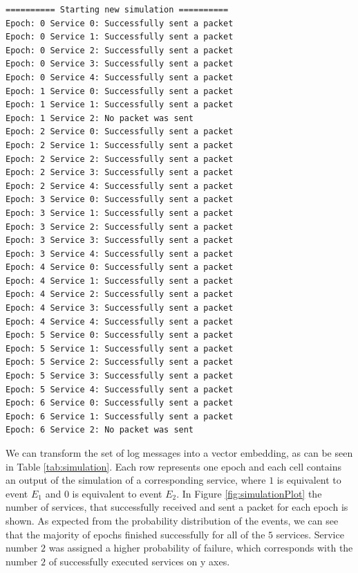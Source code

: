 \begin{verbatim}
========== Starting new simulation ==========
Epoch: 0 Service 0: Successfully sent a packet
Epoch: 0 Service 1: Successfully sent a packet
Epoch: 0 Service 2: Successfully sent a packet
Epoch: 0 Service 3: Successfully sent a packet
Epoch: 0 Service 4: Successfully sent a packet
Epoch: 1 Service 0: Successfully sent a packet
Epoch: 1 Service 1: Successfully sent a packet
Epoch: 1 Service 2: No packet was sent
Epoch: 2 Service 0: Successfully sent a packet
Epoch: 2 Service 1: Successfully sent a packet
Epoch: 2 Service 2: Successfully sent a packet
Epoch: 2 Service 3: Successfully sent a packet
Epoch: 2 Service 4: Successfully sent a packet
Epoch: 3 Service 0: Successfully sent a packet
Epoch: 3 Service 1: Successfully sent a packet
Epoch: 3 Service 2: Successfully sent a packet
Epoch: 3 Service 3: Successfully sent a packet
Epoch: 3 Service 4: Successfully sent a packet
Epoch: 4 Service 0: Successfully sent a packet
Epoch: 4 Service 1: Successfully sent a packet
Epoch: 4 Service 2: Successfully sent a packet
Epoch: 4 Service 3: Successfully sent a packet
Epoch: 4 Service 4: Successfully sent a packet
Epoch: 5 Service 0: Successfully sent a packet
Epoch: 5 Service 1: Successfully sent a packet
Epoch: 5 Service 2: Successfully sent a packet
Epoch: 5 Service 3: Successfully sent a packet
Epoch: 5 Service 4: Successfully sent a packet
Epoch: 6 Service 0: Successfully sent a packet
Epoch: 6 Service 1: Successfully sent a packet
Epoch: 6 Service 2: No packet was sent
 \end{verbatim}
 
We can transform the set of log messages into a vector embedding, as can be seen in Table \ref{tab:simulation}. Each row represents one epoch and each cell contains an output of the simulation of a corresponding service, where $1$ is equivalent to event $E_1$ and $0$ is equivalent to event $E_2$. In Figure \ref{fig:simulationPlot} the number of services, that successfully received and sent a packet for each epoch is shown. As expected from the probability distribution of the events, we can see that the majority of epochs finished successfully for all of the $5$ services. Service number $2$ was assigned a higher probability of failure, which corresponds with the number $2$ of successfully executed services on y axes. 

